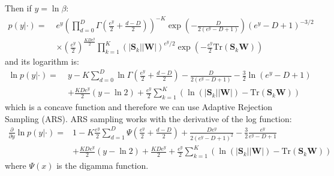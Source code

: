 \documentclass[smallextended]{svjour3}          %
\begin{document}
Then if $y = \ln\beta$:
\begin{align*}
p(y | \cdot) =\;& 
e^y
\left(\prod_{d=0}^D \Gamma (\frac{e^y}{2} + \frac{d-D}{2}) \right)^{-K}
\exp\left(-\frac{D}{2(e^y-D+1)}  \right)
(e^y-D+1)^{-3/2}
\\&\times
(\frac{e^y}{2})^{\frac{KDe^y}{2}}
\prod_{k=1}^K (|\mathbf{S}_k||\mathbf{W}|)^{e^y/2} \exp\left(-\frac{e^y}{2} \text{Tr}(\mathbf{S}_k\mathbf{W})\right)
\end{align*}
and its logarithm is:
\begin{align*}
\ln p(y | \cdot) 
=\;& 
y 
-K \sum_{d=0}^D \ln\Gamma (\frac{e^y}{2} + \frac{d-D}{2})
-\frac{D}{2(e^y-D+1)}
-\frac{3}{2}\ln(e^y-D+1)
\\&
+\frac{KDe^y}{2}(y - \ln2)
+\frac{e^y}{2} \sum_{k=1}^K \left( \ln (|\mathbf{S}_k||\mathbf{W}|) - \text{Tr}(\mathbf{S}_k\mathbf{W})\right)
\end{align*}
which is a concave function and therefore we can use Adaptive Rejection Sampling (ARS). ARS sampling works with the derivative of the log function:
\begin{align*}
\frac{\partial}{\partial y} \ln p(y | \cdot) 
=& 
1-K \frac{e^y}{2} \sum_{d=1}^D \Psi (\frac{e^y}{2} + \frac{d-D}{2})
+\frac{De^y}{2(e^y-D+1)^2}
-\frac{3}{2}\frac{e^y}{e^y-D+1}
\\&
+\frac{KDe^y}{2}(y - \ln2) + \frac{KDe^y}{2}
+\frac{e^y}{2} \sum_{k=1}^K \left(\ln (|\mathbf{S}_k||\mathbf{W}|) - \text{Tr}(\mathbf{S}_k\mathbf{W})\right)
\end{align*}
where $\Psi(x)$ is the digamma function.


\end{document}
